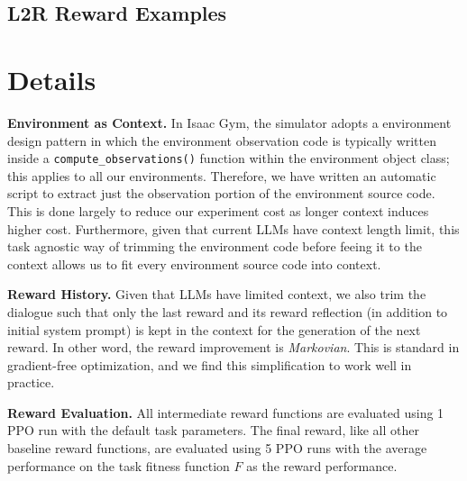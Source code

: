 \subsection{L2R Reward Examples}

\renewcommand\lstlistingname{Example}
\setcounter{lstlisting}{0}





\section{\ourmethod Details}
\label{appendix:experimental-details}

\textbf{Environment as Context.} In Isaac Gym, the simulator adopts a environment design pattern in which the environment observation code is typically written inside a \texttt{compute\_observations()} function within the environment object class; this applies to all our environments. Therefore, we have written an automatic script to extract just the observation portion of the environment source code. This is done largely to reduce our experiment cost as longer context induces higher cost. Furthermore, given that current LLMs have context length limit, this task agnostic way of trimming the environment code before feeing it to the context allows us to fit every environment source code into context. 

\renewcommand\lstlistingname{Example}
\setcounter{lstlisting}{0}


\textbf{\ourmethod Reward History.} Given that LLMs have limited context, we also trim the \ourmethod dialogue such that only the last reward and its reward reflection (in addition to initial system prompt) is kept in the context for the generation of the next reward. In other word, the reward improvement is \textit{Markovian}. This is standard in gradient-free optimization, and we find this simplification to work well in practice.

\textbf{\ourmethod Reward Evaluation.} All intermediate \ourmethod reward functions are evaluated using 1 PPO run with the default task parameters. The final \ourmethod reward, like all other baseline reward functions, are evaluated using 5 PPO runs with the average performance on the task fitness function $F$ as the reward performance. 

